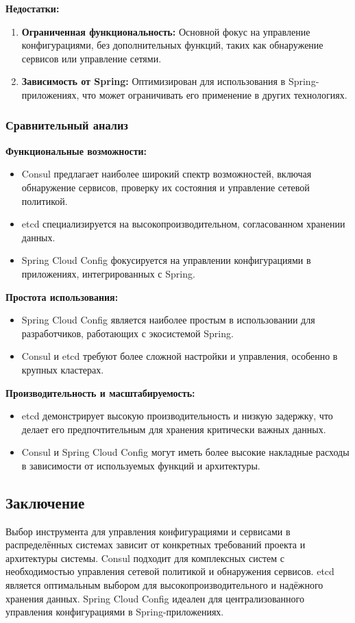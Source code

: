 \textbf{Недостатки:}
\begin{enumerate}[label=\arabic*.]
    \item \textbf{Ограниченная функциональность:} Основной фокус на управление конфигурациями, без дополнительных функций, таких как обнаружение сервисов или управление сетями.
    \item \textbf{Зависимость от Spring:} Оптимизирован для использования в Spring-приложениях, что может ограничивать его применение в других технологиях.
\end{enumerate}

\subsubsection{Сравнительный анализ}

\textbf{Функциональные возможности:}
\begin{itemize}
    \item Consul предлагает наиболее широкий спектр возможностей, включая обнаружение сервисов, проверку их состояния и управление сетевой политикой.
    \item etcd специализируется на высокопроизводительном, согласованном хранении данных.
    \item Spring Cloud Config фокусируется на управлении конфигурациями в приложениях, интегрированных с Spring.
\end{itemize}

\textbf{Простота использования:}
\begin{itemize}
    \item Spring Cloud Config является наиболее простым в использовании для разработчиков, работающих с экосистемой Spring.
    \item Consul и etcd требуют более сложной настройки и управления, особенно в крупных кластерах.
\end{itemize}

\textbf{Производительность и масштабируемость:}
\begin{itemize}
    \item etcd демонстрирует высокую производительность и низкую задержку, что делает его предпочтительным для хранения критически важных данных.
    \item Consul и Spring Cloud Config могут иметь более высокие накладные расходы в зависимости от используемых функций и архитектуры.
\end{itemize}

\subsection{Заключение}

Выбор инструмента для управления конфигурациями и сервисами в распределённых системах зависит от конкретных требований проекта и архитектуры системы.
Consul подходит для комплексных систем с необходимостью управления сетевой политикой и обнаружения сервисов.
etcd является оптимальным выбором для высокопроизводительного и надёжного хранения данных.
Spring Cloud Config идеален для централизованного управления конфигурациями в Spring-приложениях.
